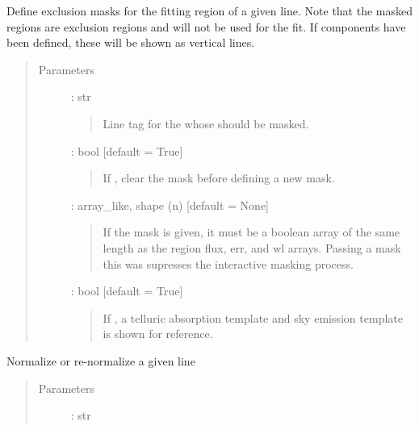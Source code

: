 \documentclass[letterpaper,10pt,english]{sphinxmanual}
\begin{document}
\begin{fulllineitems}
\begin{fulllineitems}
\label{\detokenize{api:VoigtFit.DataSet.mask_line}}
Define exclusion masks for the fitting region of a given line.
Note that the masked regions are exclusion regions and will not be used for the fit.
If components have been defined, these will be shown as vertical lines.
\begin{quote}\begin{description}
\item[{Parameters}] \leavevmode
{} : str
\begin{quote}

Line tag for the  whose
{\hyperref[\detokenize{api:regions.Region}]{}} should be masked.
\end{quote}

 : bool   {[}default = True{]}
\begin{quote}

If , clear the mask before defining a new mask.
\end{quote}

 : array\_like, shape (n)   {[}default = None{]}
\begin{quote}

If the mask is given, it must be a boolean array of the same length
as the region flux, err, and wl arrays.
Passing a mask this was supresses the interactive masking process.
\end{quote}

 : bool   {[}default = True{]}
\begin{quote}

If , a telluric absorption template and sky emission template
is shown for reference.
\end{quote}

\end{description}\end{quote}

\end{fulllineitems}


\begin{fulllineitems}
\label{\detokenize{api:VoigtFit.DataSet.normalize_line}}
Normalize or re-normalize a given line
\begin{quote}\begin{description}
\item[{Parameters}] \leavevmode
{} : str
\begin{quote}


\end{quote}
\end{description}
\end{quote}
\end{fulllineitems}
\end{fulllineitems}
\end{document}
